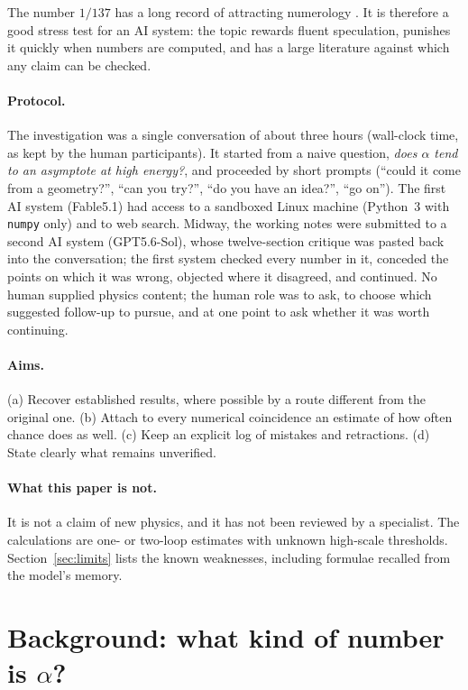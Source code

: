 \documentclass[11pt,a4paper]{article}
\begin{document}
The number $1/137$ has a long record of attracting numerology \cite{Eddington,Wyler,Robertson}. It is therefore a good
stress test for an AI system: the topic rewards fluent speculation, punishes it quickly when numbers are computed, and has
a large literature against which any claim can be checked.

\paragraph{Protocol.} The investigation was a single conversation of about three hours (wall-clock time, as kept by the
human participants). It started from a naive question, \emph{does $\alpha$ tend to an asymptote at high energy?}, and
proceeded by short prompts (``could it come from a geometry?'', ``can you try?'', ``do you have an idea?'', ``go on'').
The first AI system (Fable5.1) had access to a sandboxed Linux machine (Python~3 with \texttt{numpy} only) and to web
search. Midway, the working notes were submitted to a second AI system (GPT5.6-Sol), whose twelve-section critique was
pasted back into the conversation; the first system checked every number in it, conceded the points on which it was
wrong, objected where it disagreed, and continued. No human supplied physics content; the human role was to ask, to
choose which suggested follow-up to pursue, and at one point to ask whether it was worth continuing.

\paragraph{Aims.} (a) Recover established results, where possible by a route different from the original one.
(b) Attach to every numerical coincidence an estimate of how often chance does as well.
(c) Keep an explicit log of mistakes and retractions. (d) State clearly what remains unverified.

\paragraph{What this paper is not.} It is not a claim of new physics, and it has not been reviewed by a specialist.
The calculations are one- or two-loop estimates with unknown high-scale thresholds. Section~\ref{sec:limits} lists
the known weaknesses, including formulae recalled from the model's memory.

\section{Background: what kind of number is \texorpdfstring{$\alpha$}{alpha}?}
\end{document}

